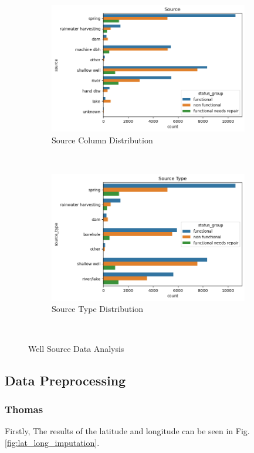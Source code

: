 \documentclass[conference]{IEEEtran}
\begin{document}
\begin{figure}[t]
    \centering
    \begin{subfigure}[t]{0.5\textwidth}
      \centering
      \includegraphics[height=2.25in]{figures/jason_source.png}
      \caption{Source Column Distribution}
    \end{subfigure}%
    ~
    \begin{subfigure}[t]{0.5\textwidth}
      \centering
      \includegraphics[height=2.25in]{figures/jason_sourcetype.png}
      \caption{Source Type Distribution}
    \end{subfigure}
    ~
    \caption{Well Source Data Analysis}
    \label{fig:source}
\end{figure}

\subsection{Data Preprocessing}

\subsubsection{Thomas}

Firstly, The results of the latitude and longitude can be seen in Fig. \ref{fig:lat_long_imputation}.
\end{document}
